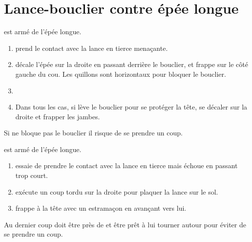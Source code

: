 \section{Lance-bouclier contre épée longue}


\begin{technique}

\A est armé de l'épée longue.

\begin{enumerate}
	\item \A prend le contact avec la lance en tierce menaçante.
	
	\item \A décale l'épée sur la droite en passant derrière le bouclier, et frappe sur le côté gauche du cou.
	Les quillons sont horizontaux pour bloquer le bouclier.
	
	\item {}
	
	\item Dans tous les cas, si \D lève le bouclier pour se protéger la tête, se décaler sur la droite et frapper les jambes.
\end{enumerate}

Si \A ne bloque pas le bouclier il risque de se prendre un coup.

\end{technique}



\begin{technique}

\A est armé de l'épée longue.

\begin{enumerate}
	\item \A essaie de prendre le contact avec la lance en tierce mais échoue en passant trop court.
	
	\item \A exécute un coup tordu sur la droite pour plaquer la lance sur le sol.
	
	\item \A frappe \D à la tête avec un estramaçon en avançant vers lui.
\end{enumerate}

Au dernier coup \A doit être près de \D et être prêt à lui tourner autour pour éviter de se prendre un coup.

\end{technique}
